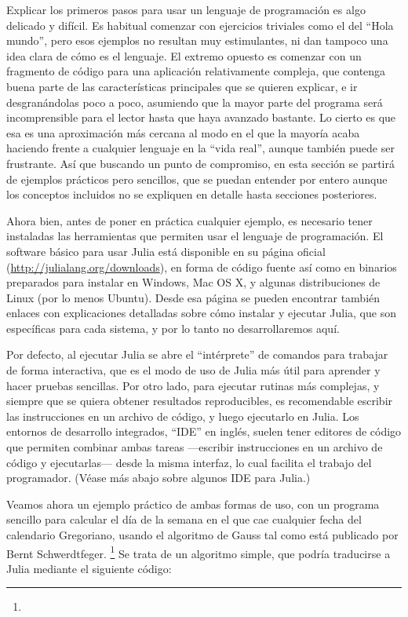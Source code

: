 ﻿\documentclass{article}
\begin{document}
Explicar los primeros pasos para usar un lenguaje de programación es algo delicado y difícil. Es habitual comenzar con ejercicios triviales como el del ``Hola mundo'', pero esos ejemplos no resultan muy estimulantes, ni dan tampoco una idea clara de cómo es el lenguaje. El extremo opuesto es comenzar con un fragmento de código para una aplicación relativamente compleja, que contenga buena parte de las características principales que se quieren explicar, e ir desgranándolas poco a poco, asumiendo que la mayor parte del programa será incomprensible para el lector hasta que haya avanzado bastante. Lo cierto es que esa es una aproximación más cercana al modo en el que la mayoría acaba haciendo frente a cualquier lenguaje en la ``vida real'', aunque también puede ser frustrante. Así que buscando un punto de compromiso, en esta sección se partirá de ejemplos prácticos pero sencillos, que se puedan entender por entero aunque los conceptos incluidos no se expliquen en detalle hasta secciones posteriores.

Ahora bien, antes de poner en práctica cualquier ejemplo, es necesario tener instaladas las herramientas que permiten usar el lenguaje de programación. El software básico para usar Julia está disponible en su página oficial (\url{http://julialang.org/downloads}), en forma de código fuente así como en binarios preparados para instalar en Windows, Mac OS X, y algunas distribuciones de Linux (por lo menos Ubuntu). Desde esa página se pueden encontrar también enlaces con explicaciones detalladas sobre cómo instalar y ejecutar Julia, que son específicas para cada sistema, y por lo tanto no desarrollaremos aquí.

Por defecto, al ejecutar Julia se abre el ``intérprete'' de comandos para trabajar de forma interactiva, que es el modo de uso de Julia más útil para aprender y hacer pruebas sencillas. Por otro lado, para ejecutar rutinas más complejas, y siempre que se quiera obtener resultados reproducibles, es recomendable escribir las instrucciones en un archivo de código, y luego ejecutarlo en Julia. Los entornos de desarrollo integrados, ``IDE'' en inglés, suelen tener editores de código que permiten combinar ambas tareas ---escribir instrucciones en un archivo de código y ejecutarlas--- desde la misma interfaz, lo cual facilita el trabajo del programador. (Véase más abajo sobre algunos IDE para Julia.)

Veamos ahora un ejemplo práctico de ambas formas de uso, con un programa sencillo para calcular el día de la semana en el que cae cualquier fecha del calendario Gregoriano, usando el algoritmo de Gauss tal como está publicado por Bernt Schwerdtfeger.%
\footnote{%
%
} Se trata de un algoritmo simple, que podría traducirse a Julia mediante el siguiente código: 
\end{document}
